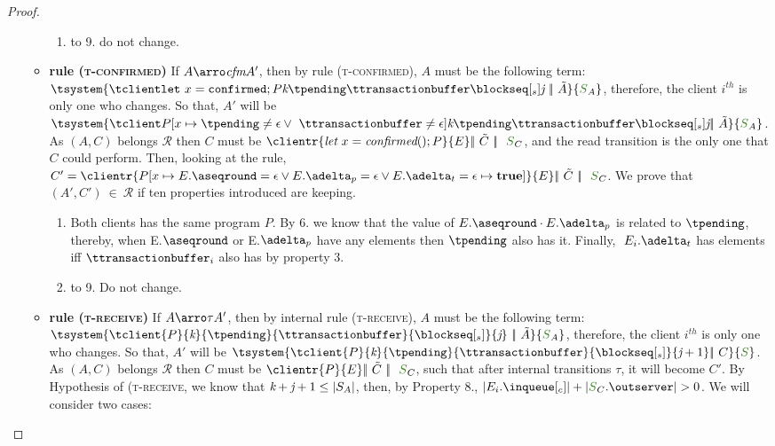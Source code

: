\begin{proof}
\begin{itemize}
\begin{itemize}
\begin{enumerate}
							\item to 9. do not change.
						\end{enumerate}
					\item {\bf rule (\textsc{t-confirmed})} If $A \arroi{\confirmedtran} A'$, then by rule (\textsc{\footnotesize{t-confirmed}}), $A$ must be the following term: $ \tsystem{\tclienti{\tconfirmedins{x}}{\tknown}{\tpending}{\ttransactionbuffer}{\tsent}{\treceivebuffer}\ \bigpar\ \tilde{A}}{\queuemessage_A}$, therefore, the client $i^{th}$ is only one who changes. So that, $A'$ will be $\tsystem{\tclienti{\update{\tprogram}{x}{\tpending \neq \emptysequence \vee\ \ttransactionbuffer \neq \epsilon}}{\tknown}{\tpending}{\ttransactionbuffer}{\tsent}{\treceivebuffer}\bigpar\ \tilde{A}}{\queuemessage_A}$. As $(A,C)$ belongs $\mathcal{R}$ then $C$ must be $\clientr{\confirmedins{x}}{\stateclient} \bigpar\ \tilde{C} \ \bigpar\ \ \queuemessage_C$, and the read transition is the only one that $C$ could perform.
				Then, looking at the rule, $C' = \clientr{\update{P}{x \mapsto E.\pending = \epsilon \lor E.\pushbuffer = \epsilon \lor E.\transactionbuffer = \epsilon}{\textbf{true}}}{\stateclient} \bigpar\ \tilde{C} \ \bigpar\ \ \queuemessage_C$. We prove that $(A',C') \ \in \ \mathcal{R}$ if ten properties introduced are keeping.				
					\begin{enumerate}
						\item Both clients has the same program $P$. By 6. we know that the value of $E.\pending \cdot E.\pushbuffer$ is related to $\tpending$, thereby, when E.$\pending$ or E.$\pushbuffer$ have any elements then $\tpending$ also has it. Finally, $\ E_{i}.\transactionbuffer$ has elements iff $\ttransactionbuffer_i$ also has by property 3.
						\item to 9. Do not change.
					\end{enumerate}
					\item {\bf rule (\textsc{t-receive})} If $A \arroi{\tau} A'$, then by internal rule (\textsc{\footnotesize{t-receive}}), $A$ must be the following term: $\tsystem{\tclient{\tprogram}{\tknown}{\tpending}{\ttransactionbuffer}{\tsent}{\treceivebuffer}\ \bigpar\ \tilde{A}}{\queuemessage_A}$, therefore, the client $i^{th}$ is only one who changes. So that, $A'$ will be $\tsystem{\tclient{\tprogram}{\tknown}{\tpending}{\ttransactionbuffer}{\tsent}{\treceivebuffer + 1}\bigpar\ C}{\queuemessage}$. As	$(A,C)$ belongs $\mathcal{R}$ then $C$ must be $\clientr{\tprogram}{\stateclient} \bigpar\ \tilde{C} \ \bigpar\ \ \queuemessage_C$, such that after internal transitions $\tau$, it will become $C'$. By Hypothesis of (\textsc{\footnotesize{t-receive}}, we know that $\textit{k} + \textit{j} + 1 \leq \text{\textbar} S_A \text{\textbar}$, then, by Property 8., $|E_{i}.\inclient| + |\queuemessage_C.\outserver| > 0$. We will consider two cases:
						

\end{itemize}
\end{itemize}
\end{proof}
